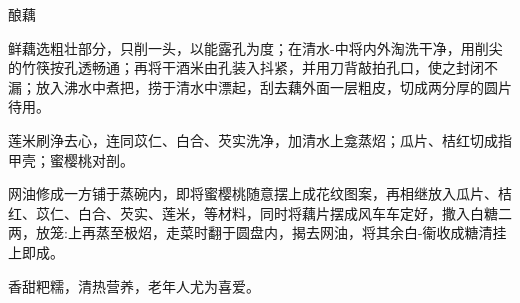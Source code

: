 \begin{recipe}[八宝酿藕]{酿藕}

\ingredients


\cooking

\step 鲜藕选粗壮部分，只削一头，以能露孔为度；在清水-中将内外淘洗干净，用削尖的竹筷按孔透畅通；再将干酒米由孔装入抖紧，并用刀背敲拍孔口，使之封闭不漏；放入沸水中煮把，捞于清水中漂起，刮去藕外面一层粗皮，切成两分厚的圆片待用。

\step 莲米刷浄去心，连同苡仁、白合、芡实洗净，加清水上龛蒸炤；瓜片、桔红切成指甲壳；蜜樱桃对剖。

\step 网油修成一方铺于蒸碗内，即将蜜樱桃随意摆上成花纹图案，再相继放入瓜片、桔红、苡仁、白合、芡实、莲米，等材料，同时将藕片摆成风车车定好，撒入白糖二两，放笼:上再蒸至极炤，走菜时翻于圆盘内，揭去网油，将其余白-衞收成糖清挂上即成。

\notes

香甜粑糯，清热营养，老年人尤为喜爱。

\end{recipe}

